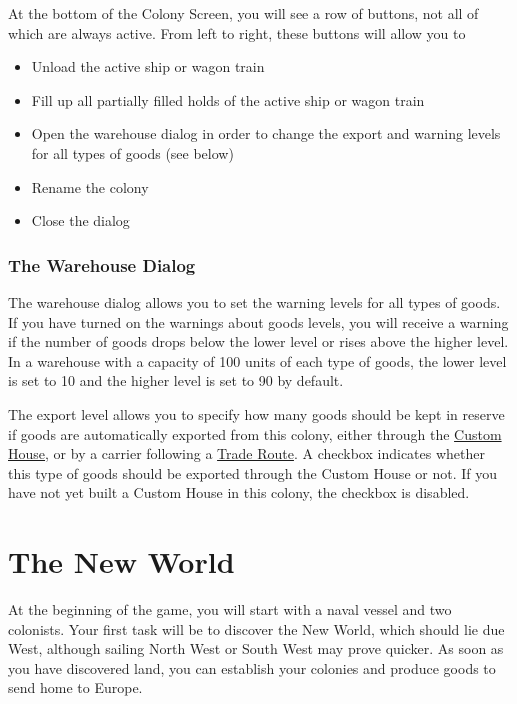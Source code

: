\documentclass[12pt]{article}
\begin{document}
At the bottom of the Colony Screen, you will see a row of buttons, not
all of which are always active. From left to right, these buttons will
allow you to

\begin{itemize}
\item Unload the active ship or wagon train
\item Fill up all partially filled holds of the active ship or
wagon train
\item Open the warehouse dialog in order to change the export and
warning levels for all types of goods (see below)
\item Rename the colony
\item Close the dialog
\end{itemize}


\hypertarget{The Warehouse Dialog}{\subsubsection{The Warehouse Dialog}}

The warehouse dialog allows you to set the warning levels for all
types of goods. If you have turned on the warnings about goods levels,
you will receive a warning if the number of goods drops below the
lower level or rises above the higher level. In a warehouse with a
capacity of 100 units of each type of goods, the lower level is set to
10 and the higher level is set to 90 by default.

The export level allows you to specify how many goods should be kept
in reserve if goods are automatically exported from this colony,
either through the \hyperlink{Custom House}{Custom House}, or by a
carrier following a \hyperlink{Trade Routes}{Trade Route}. A checkbox
indicates whether this type of goods should be exported through the
Custom House or not. If you have not yet built a Custom House in this
colony, the checkbox is disabled.


\hypertarget{The New World}{\section{The New World}}

At the beginning of the game, you will start with a naval vessel and
two colonists. Your first task will be to discover the New World,
which should lie due West, although sailing North West or South West
may prove quicker. As soon as you have discovered land, you can
establish your colonies and produce goods to send home to Europe.
\end{document}
